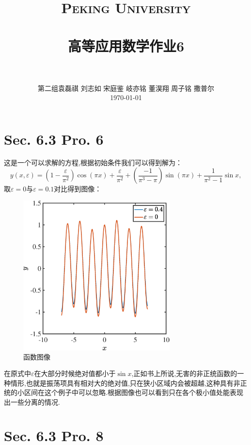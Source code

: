 \documentclass[12pt]{article}
\title{
		\vspace{-1in} 	
		\usefont{OT1}{bch}{b}{n}
		\normalfont \normalsize \textsc{\LARGE Peking University}\\[1cm] %
		\horrule{0.5pt} \\[0.5cm]
		\huge \bfseries{高等应用数学作业6} \\
		\horrule{2pt} \\[0.5cm]
}
\author{
		\normalfont 								\normalsize
		第二组\quad 袁磊祺 \quad 刘志如 \quad 宋庭鉴 \quad 岐亦铭 \quad 董淏翔 \quad 周子铭 \quad 撒普尔\\	\normalsize
        \today
}
\date{}
\begin{document}


\maketitle

\section{Sec. 6.3 Pro. 6}
这是一个可以求解的方程,根据初始条件我们可以得到解为：
\begin{equation}
	y(x,\varepsilon)=\left ( 1-\frac{\varepsilon }{\pi ^{2}}\right )\cos\left ( \pi x\right )+\frac{\varepsilon }{\pi ^{2}}+\left ( \frac{-1}{\pi ^{3}-\pi }\right )\sin \left ( \pi x\right )+\frac{1}{\pi ^{2}-1}\sin x,
\end{equation}
取$\varepsilon=0$与$\varepsilon=0.1$对比得到图像：

\begin{figure}[htp]
	\centering
	\includegraphics[width=8cm]{../1}
	\caption{函数图像}
	\label{fig:1}
\end{figure}


在原式中$\varepsilon$在大部分时候绝对值都小于$\sin x$,正如书上所说,无害的非正统函数的一种情形,也就是振荡项具有相对大的绝对值,只在狭小区域内会被超越,这种具有非正统的小区间在这个例子中可以忽略.根据图像也可以看到只在各个极小值处能表现出一些分离的情况.


\section{Sec. 6.3 Pro. 8}

\subsection{}
\end{document}
